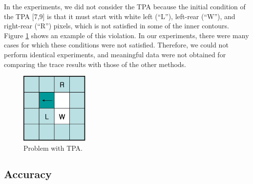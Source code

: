 
In the experiments, we did not consider the TPA because the initial condition of the TPA [7,9] is that it must start with white left (``L''), left-rear (``W''), and right-rear (``R'') pixels, which is not satisfied in some of the inner contours. Figure \ref{fig:image14} shows an example of this violation. In our experiments, there were many cases for which these conditions were not satisfied. Therefore, we could not perform identical experiments, and meaningful data were not obtained for comparing the trace results with those of the other methods. 

\begin{figure}[htbp]
	\centering
	\includegraphics[width=0.3\textwidth]{5.ExperimentalResult/fig14.png}
	\caption{Problem with TPA.}
	\label{fig:image14}
\end{figure}

\subsection{Accuracy}

